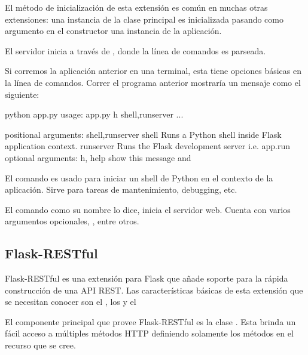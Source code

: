 El método de inicialización de esta extensión es común en muchas otras
extensiones: una instancia de la clase principal es inicializada pasando como
argumento en el constructor una instancia de la aplicación.

El servidor inicia a través de , donde la línea de comandos
es parseada.

Si corremos la aplicación anterior en una terminal, esta tiene opciones básicas
en la línea de comandos. Correr el programa anterior mostraría un mensaje como
el siguiente:

\begin{sphinxVerbatim}[commandchars=\\\{\}]
\PYGZdl{} python app.py
usage: app.py \PYG{o}{[}\PYGZhy{}h\PYG{o}{]} shell,runserver ...

positional arguments:
shell,runserver
  shell Runs a Python shell inside Flask application context.
  runserver Runs the Flask development server i.e. app.run
optional arguments:
  \PYGZhy{}h, \PYGZhy{}\PYGZhy{}help  show this  message and 
\end{sphinxVerbatim}

El comando  es usado para iniciar un shell de Python en el contexto
de la aplicación. Sirve para tareas de mantenimiento, debugging, etc.

El comando  como su nombre lo dice, inicia el servidor web. Cuenta
con varios argumentos opcionales, ,
entre otros.


\subsection*{Flask-RESTful}
\label{\detokenize{chapter_two/desc_cloudnao:flask-restful}}
Flask-RESTful es una extensión para Flask que añade soporte para la rápida
construcción de una API REST. Las características básicas de esta extensión
que se necesitan conocer
son el , los  y el 

El componente principal que provee Flask-RESTful es la clase .
Esta brinda un fácil acceso a múltiples métodos HTTP definiendo
solamente los métodos en el recurso que se cree.

